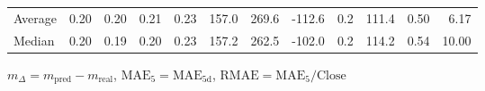 \begin{threeparttable}
{\begin{tabular}{lrrrrrrrrrrr}
Average &          0.20 &          0.20 &          0.21 &        0.23 &               157.0 &               269.6 &     -112.6 &                 0.2 &            111.4 &            0.50 &                   6.17 \\
 Median &          0.20 &          0.19 &          0.20 &        0.23 &               157.2 &               262.5 &     -102.0 &                 0.2 &            114.2 &            0.54 &                  10.00 \\
\bottomrule
\end{tabular}
}
\begin{tablenotes}\footnotesize
\item $m_\Delta=m_{\text{pred}}-m_{\text{real}}$,
$\mathrm{MAE}_5=\mathrm{MAE}_{5\text{d}}$,
$\mathrm{RMAE}=\mathrm{MAE}_5/\text{Close}$
\end{tablenotes}
\end{threeparttable}
\endgroup

